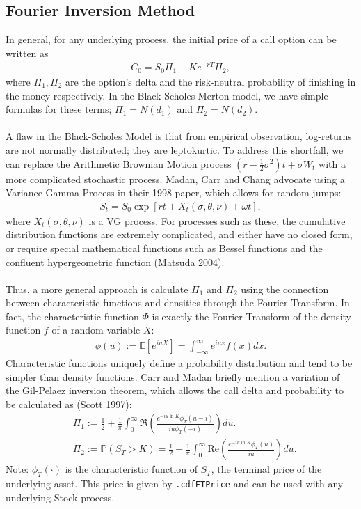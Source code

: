 \documentclass[11pt]{article}
\newcommand{\E}{\mathbb{E}}
\begin{document}
		\subsection{Fourier Inversion Method}
		In general, for any underlying process, the initial price of a call option can be written as 
		\begin{align*}
			C_{0} = S_{0}\Pi_{1} - Ke^{-rT} \Pi_{2},
		\end{align*}
		where \( \Pi_{1}, \Pi_{2} \) are the option's delta and the risk-neutral probability of finishing in the money respectively. In the Black-Scholes-Merton model, we have simple formulas for these terms; \( \Pi_{1} = N(d_1) \) and \( \Pi_{2} = N(d_2) \).\\\\ A flaw in the Black-Scholes Model is that from empirical observation, log-returns are not normally distributed; they are leptokurtic. To address this shortfall, we can replace the Arithmetic Brownian Motion process \( \left(r - \frac{1}{2}\sigma^2\right)t + \sigma W_t \) with a more complicated stochastic process. Madan, Carr and Chang advocate using a Variance-Gamma Process in their 1998 paper, which allows for random jumps:
		\begin{align*}
		S_t = S_{0} \exp\left[rt+X_{t}(\sigma, \theta, \nu) + \omega t\right],
		\end{align*}
		where \( X_{t}(\sigma, \theta, \nu) \) is a VG process. For processes such as these, the cumulative distribution functions are extremely complicated, and either have no closed form, or require special mathematical functions such as Bessel functions and the confluent hypergeometric function (Matsuda 2004). \\\\
		Thus, a more general approach is calculate \( \Pi_{1} \) and \( \Pi_{2} \) using the connection between characteristic functions and densities through the Fourier Transform. In fact, the characteristic function \( \Phi \) is exactly the Fourier Transform of the density function \( f \) of a random variable \( X \):
		\begin{align*}
			\phi(u) :=\E[e^{iuX}] = \int_{-\infty}^{\infty}e^{iux}f(x)dx.
		\end{align*}
		Characteristic functions uniquely define a probability distribution and tend to be simpler than density functions. Carr and Madan briefly mention a variation of the Gil-Pelaez inversion theorem, which allows the call delta and probability to be calculated as (Scott 1997):
		\begin{align*}
			&\Pi_{1} := \frac{1}{2} + \frac{1}{\pi}\int_{0}^{\infty}\Re\left(\frac{e^{-iu\ln K}\phi_{T}(u - i)}{iu\phi_{T}(-i)}\right)du.\\
			&\Pi_{2} := \mathbb{P}\left(S_T > K\right) = \frac{1}{2} + \frac{1}{\pi}\int_{0}^{\infty} \text{Re} \left(\frac{e^{-iu\ln K }\phi_{T}(u)}{iu}\right)du.
		\end{align*}
		Note: \( \phi_{T}(\cdot) \) is the characteristic function of \( S_T \), the terminal price of the underlying asset.
		This price is given by \colorbox{gray!25}{\texttt{.cdfFTPrice}} and can be used with any underlying Stock process.
\end{document}
